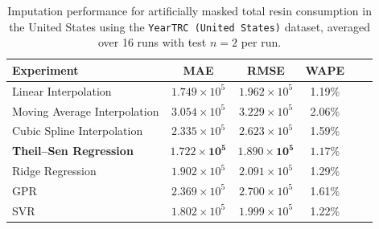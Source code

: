 \begin{table}[!ht]
	\centering
	\caption{\centering Imputation performance for artificially masked total resin consumption in the United States using the \texttt{YearTRC (United States)} dataset, averaged over 16 runs with test \(n=2\) per run.}
	\begin{tabular}{@{}lccccc@{}}
		\toprule
		\textbf{Experiment}            & \textbf{MAE}                   & \textbf{RMSE}                  & \textbf{WAPE}       \\
		\midrule
		Linear Interpolation           & \(1.749 \times 10^5\)          & \(1.962 \times 10^5\)          & 1.19\%              \\
		Moving Average Interpolation   & \(3.054 \times 10^5\)          & \(3.229 \times 10^5\)          & 2.06\%              \\
		Cubic Spline Interpolation     & \(2.335 \times 10^5\)          & \(2.623 \times 10^5\)          & 1.59\%              \\
		\textbf{Theil--Sen Regression} & \(\mathbf{1.722 \times 10^5}\) & \(\mathbf{1.890 \times 10^5}\) & \(\mathbf{1.17}\)\% \\
		Ridge Regression               & \(1.902 \times 10^5\)          & \(2.091 \times 10^5\)          & 1.29\%              \\
		GPR                            & \(2.369 \times 10^5\)          & \(2.700 \times 10^5\)          & 1.61\%              \\
		SVR                            & \(1.802 \times 10^5\)          & \(1.999 \times 10^5\)          & 1.22\%              \\
		\hline
	\end{tabular}
	\label{tab:imputation_united_states_trc}
\end{table}
